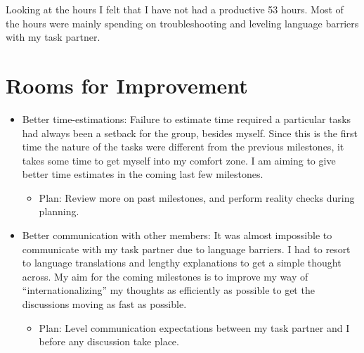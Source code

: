 Looking at the hours I felt that I have not had a productive 53 hours. Most of the hours were mainly spending on troubleshooting and leveling language barriers with my task partner. 

\section*{Rooms for Improvement}

\begin{itemize}
   \item Better time-estimations: Failure to estimate time required a particular tasks had always been a setback for the group, besides myself. Since this is the first time the nature of the tasks were different from the previous milestones, it takes some time to get myself into my comfort zone. I am aiming to give better time estimates in the coming last few milestones. 
      \begin{itemize}
         \item Plan: Review more on past milestones, and perform reality checks during planning. 
      \end{itemize}
   \item Better communication with other members: It was almost impossible to communicate with my task partner due to language barriers. I had to resort to language translations and lengthy explanations to get a simple thought across. My aim for the coming milestones is to improve my way of ``internationalizing'' my thoughts as efficiently as possible to get the discussions moving as fast as possible. 
      \begin{itemize}
         \item Plan: Level communication expectations between my task partner and I before any discussion take place.
      \end{itemize}
\end{itemize}
